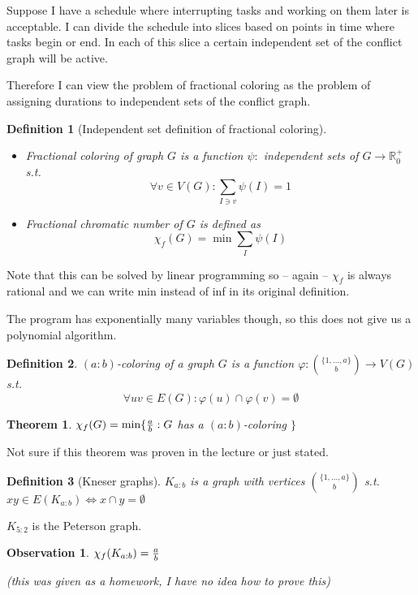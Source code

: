 \documentclass{article}
\newtheorem*{theorem}{Theorem}
\newtheorem*{definition}{Definition}
\newtheorem*{observation}{Observation}
\begin{document}
Suppose I have a schedule where interrupting tasks and working on them later is
acceptable. I can divide the schedule into slices based on points in time where
tasks begin or end. In each of this slice a certain independent set of the
conflict graph will be active.

Therefore I can view the problem of fractional coloring as the problem of
assigning durations to independent sets of the conflict graph.

\begin{definition}[Independent set definition of fractional coloring]
	~
	\begin{itemize}
		\item \emph{Fractional coloring} of graph $G$ is a function
			$\psi:$ independent sets of $G \rightarrow
			\mathbb{R}_0^+$ s.t.
			$$ \forall v \in V(G): \sum_{I \ni v} \psi(I) = 1 $$
		\item \emph{Fractional chromatic number} of $G$ is defined
			as
			$$ \chi_f(G) = \min \sum_I \psi(I) $$
	\end{itemize}
\end{definition}

\noindent
Note that this can be solved by linear programming so -- again -- $\chi_f$ is
always rational and we can write min instead of inf in its original definition.

The program has exponentially many variables though, so this does not give us a
polynomial algorithm.

\begin{definition}
	\emph{$(a:b)$-coloring} of a graph $G$ is a function $\varphi:
	\binom{\{1, ..., a\}}{b} \rightarrow V(G)$ s.t.
	$$ \forall uv \in E(G): \varphi(u) \cap \varphi(v) = \emptyset $$
\end{definition}

\begin{theorem}
	$\chi_f(G) = \min \{ {a \over b} : G$ has a $(a : b)$-coloring $\}$
\end{theorem}

\noindent
Not sure if this theorem was proven in the lecture or just stated.

\begin{definition}[Kneser graphs]
	$K_{a:b}$ is a graph with vertices $\binom{\{1,...,a\}}{b}$ s.t. $xy
	\in E(K_{a:b}) \Leftrightarrow x \cap y = \emptyset$
\end{definition}

\noindent
$K_{5:2}$ is the Peterson graph.

\begin{observation}
	$\chi_f(K_{a:b}) = {a \over b}$

	(this was given as a homework, I have no idea how to prove this)
\end{observation}
\end{document}
